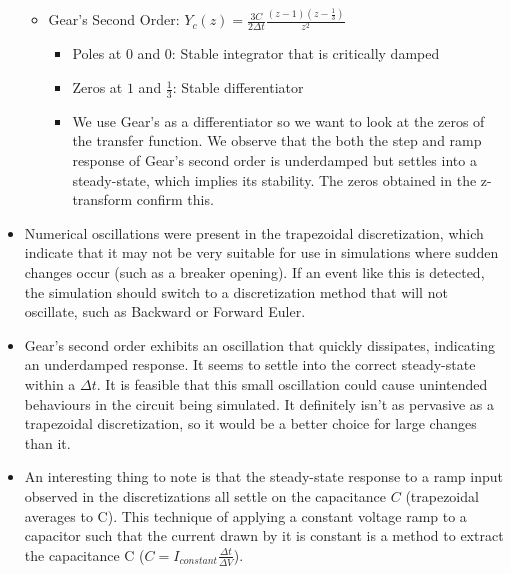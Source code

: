 \documentclass[10pt, oneside, letterpaper]{article}
\begin{document}
\begin{itemize}
\begin{itemize}
      \item Gear's Second Order: $Y_c(z) = \frac{3C}{2\Delta{}t}\frac{(z - 1)(z - \frac{1}{3})}{z^{2}}$
        \begin{itemize}
          \item Poles at $0$ and $0$: Stable integrator that is critically damped
          \item Zeros at $1$ and $\frac{1}{3}$: Stable differentiator
          \item We use Gear's as a differentiator so we want to look at the zeros of the transfer function. We observe that the both the step and ramp response of Gear's second order is underdamped but settles into a steady-state, which implies its stability. The zeros obtained in the z-transform confirm this.
        \end{itemize}
    \end{itemize}
    \item Numerical oscillations were present in the trapezoidal discretization, which indicate that it may not be very suitable for use in simulations where sudden changes occur (such as a breaker opening). If an event like this is detected, the simulation should switch to a discretization method that will not oscillate, such as Backward or Forward Euler.
    \item Gear's second order exhibits an oscillation that quickly dissipates, indicating an  underdamped response. It seems to settle into the correct steady-state within a $\Delta{}t$. It is feasible that this small oscillation could cause unintended behaviours in the circuit being simulated. It definitely isn't as pervasive as a trapezoidal discretization, so it would be a better choice for large changes than it.
    \item An interesting thing to note is that the steady-state response to a ramp input observed in the discretizations all settle on the capacitance $C$ (trapezoidal averages to C). This technique of applying a constant voltage ramp to a capacitor such that the current drawn by it is constant is a method to extract the capacitance C ($C = I_{constant}\frac{\Delta{}t}{\Delta{}V}$).
\end{itemize}


% 
\end{document}
